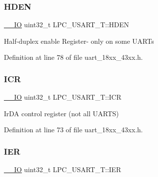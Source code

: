 \mbox{\label{struct_l_p_c___u_s_a_r_t___t_aedc3d854bf59c2f0999a8ae22e3e7bb4}} 
\subsubsection{\texorpdfstring{H\+D\+EN}{HDEN}}
{\footnotesize\ttfamily \hyperlink{core__sc300_8h_aec43007d9998a0a0e01faede4133d6be}{\+\_\+\+\_\+\+IO} uint32\+\_\+t L\+P\+C\+\_\+\+U\+S\+A\+R\+T\+\_\+\+T\+::\+H\+D\+EN}

Half-\/duplex enable Register-\/ only on some U\+A\+R\+Ts 

Definition at line 78 of file uart\+\_\+18xx\+\_\+43xx.\+h.

\mbox{\label{struct_l_p_c___u_s_a_r_t___t_a85c78774fcee5d86f82a4bd497db2b00}} 
\subsubsection{\texorpdfstring{I\+CR}{ICR}}
{\footnotesize\ttfamily \hyperlink{core__sc300_8h_aec43007d9998a0a0e01faede4133d6be}{\+\_\+\+\_\+\+IO} uint32\+\_\+t L\+P\+C\+\_\+\+U\+S\+A\+R\+T\+\_\+\+T\+::\+I\+CR}

Ir\+DA control register (not all U\+A\+R\+TS) 

Definition at line 73 of file uart\+\_\+18xx\+\_\+43xx.\+h.

\mbox{\label{struct_l_p_c___u_s_a_r_t___t_a832413236bebfb6e6495c1055b9a85ae}} 
\subsubsection{\texorpdfstring{I\+ER}{IER}}
{\footnotesize\ttfamily \hyperlink{core__sc300_8h_aec43007d9998a0a0e01faede4133d6be}{\+\_\+\+\_\+\+IO} uint32\+\_\+t L\+P\+C\+\_\+\+U\+S\+A\+R\+T\+\_\+\+T\+::\+I\+ER}

